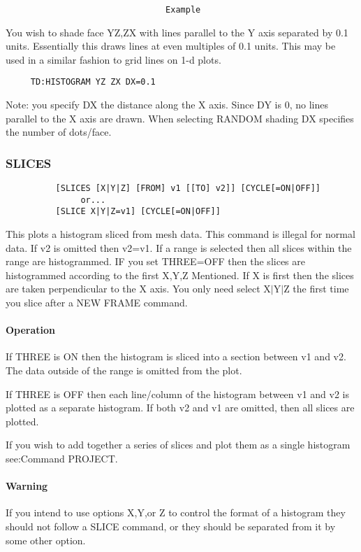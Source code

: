 \begin{verbatim}
                                Example
\end{verbatim}
You  wish  to  shade  face  YZ,ZX  with  lines  parallel  to the Y axis
separated by 0.1 units.  Essentially this draws lines at even multiples
of  0.1  units.  This may be used in a similar fashion to grid lines on
1-d plots.  
\begin{verbatim}
     TD:HISTOGRAM YZ ZX DX=0.1 
\end{verbatim}
Note:  you specify DX the distance along the X axis.  Since DY is 0, no
lines parallel to the X axis are drawn.  When selecting RANDOM  shading
DX specifies the number of dots/face.  
\subsubsection{SLICES}
\begin{verbatim}
          [SLICES [X|Y|Z] [FROM] v1 [[TO] v2]] [CYCLE[=ON|OFF]] 
               or...  
          [SLICE X|Y|Z=v1] [CYCLE[=ON|OFF]] 
\end{verbatim}

This  plots a histogram sliced from mesh data.  This command is illegal
for normal data.  If v2 is omitted then v2=v1.  If a range is  selected
then  all  slices  within  the  range  are  histogrammed.   IF  you set
THREE=OFF then the slices are histogrammed according to the first X,Y,Z
Mentioned.   If  X  is first then the slices are taken perpendicular to
the X axis.  You only need select X$|$Y$|$Z the first time you slice  after
a NEW FRAME command.  
\paragraph{Operation}
If THREE is ON then the histogram is sliced into a section between v1
and v2.  The data outside of the range is omitted from the plot.  

If THREE is OFF then each line/column of the histogram between v1 and
v2 is plotted as a  separate  histogram.   If  both  v2  and  v1  are
omitted, then all slices are plotted.  

If  you  wish  to  add together a series of slices and plot them as a
single histogram see:Command PROJECT.  
\paragraph{Warning}
If  you  intend  to  use  options X,Y,or Z to control the format of a
histogram they should not follow a SLICE command, or they  should  be
separated from it by some other option.  
